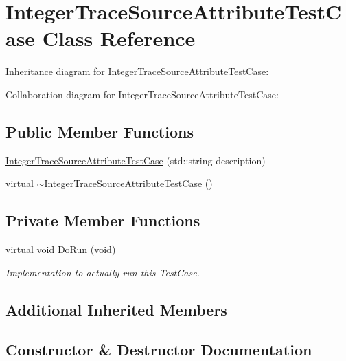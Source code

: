 \hypertarget{classIntegerTraceSourceAttributeTestCase}{}\section{Integer\+Trace\+Source\+Attribute\+Test\+Case Class Reference}
\label{classIntegerTraceSourceAttributeTestCase}


Inheritance diagram for Integer\+Trace\+Source\+Attribute\+Test\+Case\+:


Collaboration diagram for Integer\+Trace\+Source\+Attribute\+Test\+Case\+:
\subsection*{Public Member Functions}
\begin{DoxyCompactItemize}
\item 
\hyperlink{classIntegerTraceSourceAttributeTestCase_a12e3a98877951ed3e99a371046f4a389}{Integer\+Trace\+Source\+Attribute\+Test\+Case} (std\+::string description)
\item 
virtual \hyperlink{classIntegerTraceSourceAttributeTestCase_aede08463c7663b37322cbf50ba69fe13}{$\sim$\+Integer\+Trace\+Source\+Attribute\+Test\+Case} ()
\end{DoxyCompactItemize}
\subsection*{Private Member Functions}
\begin{DoxyCompactItemize}
\item 
virtual void \hyperlink{classIntegerTraceSourceAttributeTestCase_a5a2f5ce2d50307ba6e60ca97634d3234}{Do\+Run} (void)
\begin{DoxyCompactList}\small\item\em Implementation to actually run this Test\+Case. \end{DoxyCompactList}\end{DoxyCompactItemize}
\subsection*{Additional Inherited Members}


\subsection{Constructor \& Destructor Documentation}
